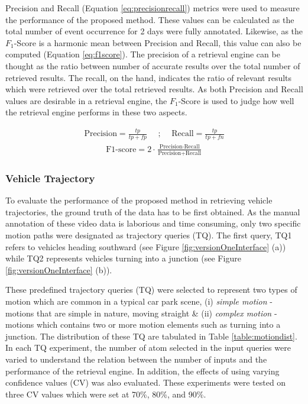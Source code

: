 Precision and Recall (Equation \ref{eq:precisionrecall}) metrics were used to
measure the performance of the proposed method. These values can be calculated
as the total number of event occurrence for 2 days were fully annotated.
Likewise, as the $F_1$-Score is a harmonic mean between Precision and Recall,
this value can also be computed (Equation \ref{eq:f1score}). The precision of a
retrieval engine can be thought as the ratio between number of accurate results
over the total number of retrieved results. The recall, on the hand, indicates
the ratio of relevant results which were retrieved over the total retrieved
results. As both Precision and Recall values are desirable in a retrieval
engine, the $F_1$-Score is used to judge how well the retrieval engine performs
in these two aspects.

\begin{align}
\label{eq:precisionrecall}
    \text{Precision} = \frac{tp}{tp + fp}   \hspace{1em} \text{ ; }  \hspace{1em} \text{Recall}  = \frac{tp}{tp + fn}
\end{align}
\begin{align}
\label{eq:f1score}
\text{F1-score}  = 2\cdot\frac{\text{Precision} \cdot \text{Recall}}{\text{Precision} + \text{Recall}}
\end{align}


\subsubsection{Vehicle Trajectory}

To evaluate the performance of the proposed method in retrieving vehicle
trajectories, the ground truth of the data has to be first obtained. As the
manual annotation of these video data is laborious and time consuming, only
two specific motion paths were designated as trajectory queries (TQ). The first
query, TQ1 refers to vehicles heading southward (see Figure
\ref{fig:versionOneInterface} (a)) while TQ2 represents vehicles turning into
a junction (see Figure \ref{fig:versionOneInterface} (b)).

These predefined trajectory queries (TQ) were selected to represent two types
of motion which are common in a typical car park scene, (i) \textit{simple
motion} - motions that are simple in nature, moving straight \& (ii)
\textit{complex motion} - motions which contains two or more motion elements
such as turning into a junction. The distribution of these TQ are tabulated in
Table \ref{table:motiondist}. In each TQ experiment, the number of atom selected
in the input queries were varied to understand the relation between the number
of inputs and the performance of the retrieval engine. In addition, the effects
of using varying confidence values (CV) was also evaluated. These experiments
were tested on three CV values which were set at 70\%, 80\%, and 90\%.


